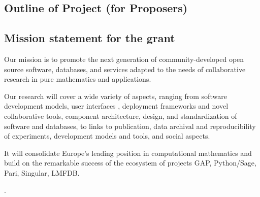 \begin{draft}
\red

\section*{Outline of Project (for Proposers)}


\subsection*{Mission statement for the grant}

Our mission is to promote the next generation of community-developed
open source software, databases, and services adapted to the needs of
collaborative research in pure mathematics and applications.

Our research will cover a wide variety of aspects, ranging from
software development models, user interfaces , deployment frameworks and novel collaborative tools,
component architecture, design, and standardization of software
 and databases, to links to publication, data archival
and reproducibility of experiments, development models and tools, and
social aspects.

It will consolidate Europe's leading position in computational
mathematics and build on the remarkable success of the ecosystem of
projects GAP, Python/Sage, Pari, Singular, LMFDB.

.

\renewcommand{\thepage}{\arabic{page}}
\setcounter{page}{1}
\black
\cleardoublepage
\end{draft}
